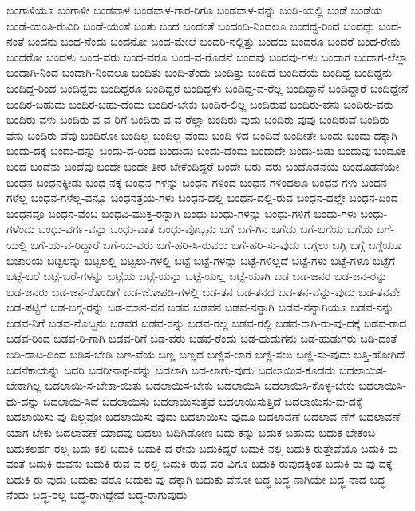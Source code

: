 {ಬಂಗಾಳಿಯೂ
ಬಂಗಾಳೀ
ಬಂಡವಾಳ
ಬಂಡವಾಳ-ಗಾರ-ರಿಗೂ
ಬಂಡವಾಳ-ವನ್ನು
ಬಂಡಿ-ಯಲ್ಲಿ
ಬಂಡೆ
ಬಂಡೆಯ
ಬಂಡೆ-ಯಂತಿ-ರುವಿರಿ
ಬಂಡೆ-ಯಂತೆ
ಬಂತು
ಬಂದ
ಬಂದಂತೆ
ಬಂದಂದಿ-ನಿಂದಲೂ
ಬಂದದ್ದ-ರಿಂದ
ಬಂದದ್ದು
ಬಂದ-ನಂತೆ
ಬಂದನು
ಬಂದ-ನೆಂದು
ಬಂದನೋ
ಬಂದ-ಮೇಲೆ
ಬಂದರಿ-ನಲ್ಲಿತ್ತು
ಬಂದರು
ಬಂದರೂ
ಬಂದರೆ
ಬಂದ-ರೇನು
ಬಂದರೋ
ಬಂದಳು
ಬಂದ-ವರು
ಬಂದ-ವರೂ
ಬಂದ-ವ-ರೊಡನೆ
ಬಂದವು
ಬಂದವು-ಗಳು
ಬಂದಾಗ
ಬಂದಾಗ-ಲೆಲ್ಲಾ
ಬಂದಾಗಿ-ನಿಂದ
ಬಂದಾಗಿ-ನಿಂದಲೂ
ಬಂದಿತು
ಬಂದಿ-ತೆಂದು
ಬಂದಿತ್ತು
ಬಂದಿದೆ
ಬಂದಿದೆಯೆ
ಬಂದಿದ್ದ
ಬಂದಿದ್ದನು
ಬಂದಿದ್ದ-ರಿಂದ
ಬಂದಿದ್ದರು
ಬಂದಿದ್ದರೂ
ಬಂದಿದ್ದರೆ
ಬಂದಿದ್ದಳು
ಬಂದಿದ್ದ-ವ-ರೆಲ್ಲ
ಬಂದಿದ್ದಾನೆ
ಬಂದಿದ್ದಾರೆ
ಬಂದಿದ್ದೇನೆ
ಬಂದಿರ-ಬಹುದು
ಬಂದಿರ-ಬಹು-ದೆಂದು
ಬಂದಿರ-ಬೇಕು
ಬಂದಿರ-ಲಿಲ್ಲ
ಬಂದಿರುವ
ಬಂದಿರು-ವನು
ಬಂದಿರು-ವರು
ಬಂದಿರು-ವಳು
ಬಂದಿರು-ವ-ವ-ರಿಗೆ
ಬಂದಿರು-ವ-ವ-ರೆಲ್ಲಾ
ಬಂದಿರು-ವುದು
ಬಂದಿರು-ವುವು
ಬಂದಿರುವೆ
ಬಂದಿರು-ವೆನು
ಬಂದಿರು-ವೆವು
ಬಂದಿರೋ
ಬಂದಿಲ್ಲ
ಬಂದಿಲ್ಲ-ವೆಂದು
ಬಂದಿ-ಳಿದ
ಬಂದಿವೆ
ಬಂದೀತೇ
ಬಂದು
ಬಂದು-ದಕ್ಕಾಗಿ
ಬಂದು-ದಕ್ಕೆ
ಬಂದು-ದನ್ನು
ಬಂದು-ದ-ರಿಂದ
ಬಂದುದು
ಬಂದು-ದೆಂದು
ಬಂದುದೇ
ಬಂದು-ಬಿಡು
ಬಂದುವು
ಬಂದೂಕ
ಬಂದೆ
ಬಂದೆನು
ಬಂದೆವು
ಬಂದೇ
ಬಂದೇ-ತೀರ-ಬೇಕೆಂದಿದ್ದರೆ
ಬಂದೇ-ಬರು-ವರು
ಬಂದೊಡನೆಯೆ
ಬಂದೊಡನೆಯೇ
ಬಂಧನ
ಬಂಧನಕ್ಕೀಡು
ಬಂಧ-ನಕ್ಕೆ
ಬಂಧನ-ಗಳನ್ನು
ಬಂಧನ-ಗಳಿಂದ
ಬಂಧನ-ಗಳಿಂದಲೂ
ಬಂಧನ-ಗಳು
ಬಂಧನ-ಗಳೆಲ್ಲ
ಬಂಧನ-ಗಳೆಲ್ಲ-ವನ್ನೂ
ಬಂಧನತ್ರಯ-ಗಳು
ಬಂಧನ-ದಲ್ಲಿ
ಬಂಧನ-ದಲ್ಲಿ-ರುವ
ಬಂಧನ-ದಲ್ಲೇ
ಬಂಧನ-ದಿಂದ
ಬಂಧನವೂ
ಬಂಧನ-ವೆಂಬ
ಬಂಧವಿ-ಮುಕ್ತ-ರನ್ನಾಗಿ
ಬಂಧು
ಬಂಧು-ಗಳನ್ನು
ಬಂಧು-ಗಳಿಗೆ
ಬಂಧು-ಗಳು
ಬಂಧು-ಗಳೆಂದು
ಬಂಧು-ವರ್ಗ-ವನ್ನು
ಬಂಧು-ವಾತ
ಬಂಧು-ವೊಬ್ಬನು
ಬಗೆ
ಬಗೆ-ಗಿನ
ಬಗೆದು
ಬಗೆ-ಬಗೆಯ
ಬಗೆಯ
ಬಗೆ-ಯಲ್ಲಿ
ಬಗೆ-ಯ-ವ-ರಿದ್ದಾರೆ
ಬಗೆ-ಯ-ವರು
ಬಗೆ-ಹರಿ-ಸಿ-ರುವರು
ಬಗೆ-ಹರಿ-ಸು-ವುದು
ಬಗ್ಗಲು
ಬಗ್ಗಿ
ಬಗ್ಗೆ
ಬಗ್ಗೆಯೂ
ಬಜಾರಿಯ
ಬಟ್ಟಲನ್ನು
ಬಟ್ಟಲಲ್ಲಿ
ಬಟ್ಟಲು-ಗಳಲ್ಲಿ
ಬಟ್ಟೆ
ಬಟ್ಟೆ-ಗಳನ್ನು
ಬಟ್ಟೆ-ಗಳಿಲ್ಲದೆ
ಬಟ್ಟೆ-ಗಳು
ಬಟ್ಟೆ-ಗಳೂ
ಬಟ್ಟೆಗೆ
ಬಟ್ಟೆ-ಬರೆ
ಬಟ್ಟೆ-ಬರೆ-ಗಳನ್ನು
ಬಟ್ಟೆಯ
ಬಟ್ಟೆ-ಯನ್ನು
ಬಟ್ಟೆ-ಯಲ್ಲ
ಬಟ್ಟೆ-ಯಾಗಿ
ಬಡ
ಬಡ-ಜನರ
ಬಡ-ಜನ-ರನ್ನು
ಬಡ-ಜನರು
ಬಡ-ಜನ-ರೊಂದಿಗೆ
ಬಡ-ಜೋಪಡಿ-ಗಳಲ್ಲಿ
ಬಡ-ತನ
ಬಡ-ತನದ
ಬಡ-ತನ-ವೆನ್ನು-ವುದು
ಬಡ-ತನವೇ
ಬಡ-ಪಟ್ಟಿಗೆ
ಬಡ-ಬಗ್ಗ-ರನ್ನು
ಬಡ-ಮಾನ-ವನ
ಬಡವ
ಬಡವನ
ಬಡವ-ನನ್ನಾಗಿ
ಬಡವ-ನನ್ನಾಗಿಯೂ
ಬಡವ-ನನ್ನು
ಬಡವ-ನಿಗೆ
ಬಡವ-ನೊಬ್ಬನು
ಬಡವರ
ಬಡವ-ರನ್ನು
ಬಡವ-ರಲ್ಲ
ಬಡವ-ರಲ್ಲಿ
ಬಡವ-ರಾಗಿ-ರು-ವು-ದಕ್ಕೆ
ಬಡವ-ರಾದ
ಬಡವ-ರಿಂದ
ಬಡವ-ರಿ-ಗಾಗಿ
ಬಡವ-ರಿಗೆ
ಬಡ-ವರು
ಬಡವ-ರೆಂದು
ಬಡ-ಹುಡುಗನು
ಬಡ-ಹುಡುಗರು
ಬಡಿ-ದಂತೆ
ಬಡಿ-ದಾಟ-ದಿಂದ
ಬಡಿಸ-ಬೇಡಿ
ಬಣ-ವೆಯ
ಬಣ್ಣ
ಬಣ್ಣದ
ಬಣ್ಣಿಸ-ಲಾರೆ
ಬಣ್ಣಿ-ಸಲು
ಬಣ್ಣಿ-ಸು-ವುದು
ಬತ್ತಿ-ಹೋಗಿದೆ
ಬದನೆಕಾಯನ್ನು
ಬದರಿ
ಬದರೀನಾಥ-ವನ್ನು
ಬದಲಾಗಿ
ಬದ-ಲಾಗು-ವುದು
ಬದಲಾಯಿಸ-ಕೂಡದು
ಬದಲಾಯಿಸ-ಬೇಕಾಗಿಲ್ಲ
ಬದಲಾಯಿ-ಸ-ಬೇಕಾ-ಯಿತು
ಬದಲಾಯಿಸ-ಬೇಕು
ಬದಲಾಯಿಸಿ
ಬದಲಾಯಿಸಿ-ಕೊಳ್ಳ-ಬೇಕು
ಬದಲಾಯಿಸಿ-ದು-ದನ್ನು
ಬದಲಾಯಿ-ಸಿದೆ
ಬದಲಾಯಿಸು
ಬದಲಾಯಿಸುತ್ತವೆ
ಬದಲಾಯಿಸುತ್ತಿದೆ
ಬದಲಾಯಿಸು-ವು-ದಕ್ಕೆ
ಬದಲಾಯಿಸು-ವು-ದಿಲ್ಲವೋ
ಬದಲಾಯಿಸು-ವುದು
ಬದಲಾಯಿಸು-ವುದೂ
ಬದಲಾವಣೆ
ಬದಲಾವ-ಣೆಗೆ
ಬದಲಾವಣೆ-ಯಾಗ-ಬೇಕು
ಬದಲಾವಣೆ-ಯಾದವು
ಬದಲು
ಬದಿಗಿಡೋಣ
ಬದು-ಕನ್ನು
ಬದುಕ-ಬಹುದು
ಬದುಕ-ಬೇಕೆಂಬ
ಬದುಕಲರ್ಹ-ರಲ್ಲ
ಬದು-ಕಲಿ
ಬದುಕಿ
ಬದುಕಿ-ದ-ರೇನು
ಬದುಕಿದ್ದರೆ
ಬದುಕಿ-ನಲ್ಲಿ
ಬದುಕಿ-ರುತ್ತೇವೆಯೊ
ಬದುಕಿ-ರು-ವಂತೆ
ಬದುಕಿ-ರುವನು
ಬದುಕಿ-ರುವ-ವ-ರಲ್ಲಿ
ಬದುಕಿ-ರುವ-ವರೆ-ವಿಗೂ
ಬದುಕಿ-ರುವುದಕ್ಕಿಂತ
ಬದುಕಿ-ರು-ವು-ದಕ್ಕೆ
ಬದುಕಿ-ರು-ವುದು
ಬದುಕು-ವರೊ
ಬದುಕು-ವು-ದಕ್ಕಾಗಿ
ಬದುಕು-ವೆನೋ
ಬದ್ಧ
ಬದ್ಧ-ನಾಗಿಯೇ
ಬದ್ಧ-ನಾದ
ಬದ್ಧ-ನೆಂದು
ಬದ್ಧ-ರಲ್ಲ
ಬದ್ಧ-ರಾಗಿದ್ದೇವೆ
ಬದ್ಧ-ರಾಗುವುದು
}

